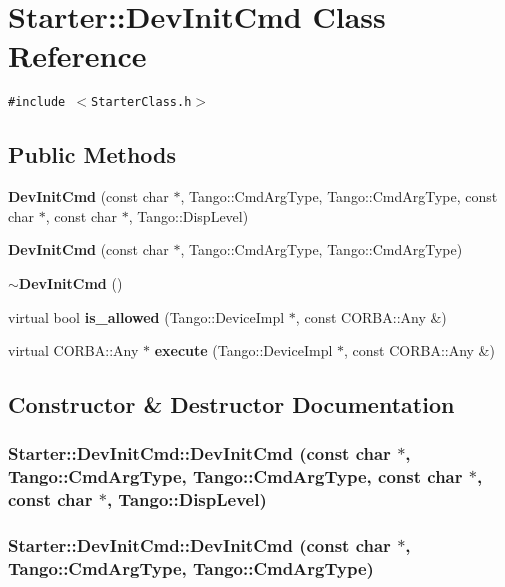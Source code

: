 \section{Starter::Dev\-Init\-Cmd  Class Reference}
\label{classStarter_1_1DevInitCmd}
{\tt \#include $<$Starter\-Class.h$>$}

\subsection*{Public Methods}
\begin{CompactItemize}
\item 
{\bf Dev\-Init\-Cmd} (const char $\ast$, Tango::Cmd\-Arg\-Type, Tango::Cmd\-Arg\-Type, const char $\ast$, const char $\ast$, Tango::Disp\-Level)
\item 
{\bf Dev\-Init\-Cmd} (const char $\ast$, Tango::Cmd\-Arg\-Type, Tango::Cmd\-Arg\-Type)
\item 
{\bf $\sim$Dev\-Init\-Cmd} ()
\item 
virtual bool {\bf is\_\-allowed} (Tango::Device\-Impl $\ast$, const CORBA::Any \&)
\item 
virtual CORBA::Any $\ast$ {\bf execute} (Tango::Device\-Impl $\ast$, const CORBA::Any \&)
\end{CompactItemize}


\subsection{Constructor \& Destructor Documentation}
\subsubsection{\setlength{\rightskip}{0pt plus 5cm}Starter::Dev\-Init\-Cmd::Dev\-Init\-Cmd (const char $\ast$, Tango::Cmd\-Arg\-Type, Tango::Cmd\-Arg\-Type, const char $\ast$, const char $\ast$, Tango::Disp\-Level)}\label{classStarter_1_1DevInitCmd_a0}


\subsubsection{\setlength{\rightskip}{0pt plus 5cm}Starter::Dev\-Init\-Cmd::Dev\-Init\-Cmd (const char $\ast$, Tango::Cmd\-Arg\-Type, Tango::Cmd\-Arg\-Type)}\label{classStarter_1_1DevInitCmd_a1}


